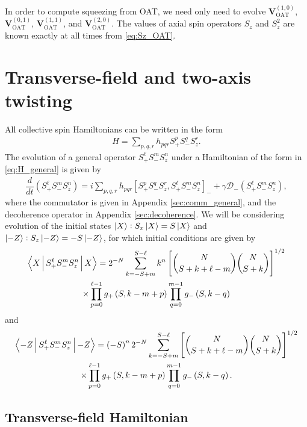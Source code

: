 \documentclass[aps,notitlepage,nofootinbib,11pt]{revtex4-1}
\renewcommand{\t}{\text} %
\newcommand{\f}[2]{\dfrac{#1}{#2}} %
\newcommand{\p}[1]{\left(#1\right)} %
\renewcommand{\sp}[1]{\left[#1\right]} %
\renewcommand{\v}{\bm} %
\newcommand{\bk}{\Braket} %
\newcommand{\D}{\mathcal{D}}
\newcommand{\1}{\mathds{1}}
\begin{document}
In order to compute squeezing from OAT, we need only need to evolve
$\v V_{\t{OAT}}^{(1,0)}$, $\v V_{\t{OAT}}^{(0,1)}$,
$\v V_{\t{OAT}}^{(1,1)}$, and $\v V_{\t{OAT}}^{(2,0)}$.  The values of
axial spin operators $S_z$ and $S_z^2$ are known exactly at all times
from \eqref{eq:Sz_OAT}.


\section{Transverse-field and two-axis twisting}

All collective spin Hamiltonians can be written in the form
\begin{align}
  H = \sum_{p,q,r} h_{pqr} S_+^p S_-^q S_z^r.
  \label{eq:H_general}
\end{align}
The evolution of a general operator $S_+^\ell S_-^m S_z^n$ under a
Hamiltonian of the form in \eqref{eq:H_general} is given by
\begin{align}
  \f{d}{dt} \p{S_+^\ell S_-^m S_z^n}
  = i\sum_{p,q,r} h_{pqr} \sp{S_+^p S_-^q S_z^r, S_+^\ell S_-^m S_z^n}_-
  + \gamma \D_-\p{S_+^\ell S_-^m S_z^n},
\end{align}
where the commutator is given in Appendix \ref{sec:comm_general}, and
the decoherence operator in Appendix \ref{sec:decoherence}.  We will
be considering evolution of the initial states
$\ket{X}:S_x\ket{X}=S\ket{X}$ and $\ket{-Z}:S_z\ket{-Z}=-S\ket{-Z}$,
for which initial conditions are given by
\begin{multline}
  \bk{X|S_+^\ell S_-^m S_z^n|X}
  =  2^{-N} \sum_{k=-S+m}^{S-\ell} k^n
  \sp{{ N \choose S+k+\ell-m } { N \choose S+k }}^{1/2} \\
  \times \prod_{p=0}^{\ell-1} g_+\p{S,k-m+p}
  \prod_{q=0}^{m-1} g_-\p{S,k-q}
\end{multline}
and
\begin{multline}
  \bk{-Z|S_+^\ell S_-^m S_z^n|-Z}
  = \p{-S}^n 2^{-N} \sum_{k=-S+m}^{S-\ell}
  \sp{{ N \choose S+k+\ell-m } { N \choose S+k }}^{1/2} \\
  \times \prod_{p=0}^{\ell-1} g_+\p{S,k-m+p}
  \prod_{q=0}^{m-1} g_-\p{S,k-q}.
\end{multline}



\subsection{Transverse-field Hamiltonian}
\end{document}
